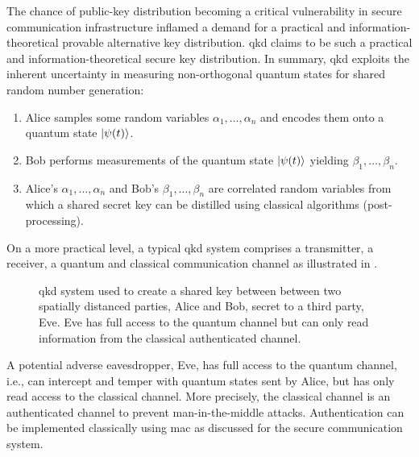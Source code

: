The chance of public-key distribution becoming a critical vulnerability in secure communication infrastructure inflamed a demand for a practical and information-theoretical provable alternative key distribution.
\gls{qkd} claims to be such a practical and information-theoretical secure key distribution.
In summary, \gls{qkd} exploits the inherent uncertainty in measuring non-orthogonal quantum states for shared random number generation:
\begin{enumerate}
	\item Alice samples some random variables $\alpha_1,\dots,\alpha_n$ and encodes them onto a quantum state $\lvert\psi(t)\rangle$.
	\item Bob performs measurements of the quantum state $\lvert\psi(t)\rangle$ yielding $\beta_1,\dots,\beta_n$.
	\item Alice's $\alpha_1,\dots,\alpha_n$ and Bob's $\beta_1,\dots,\beta_n$ are correlated random variables from which a shared secret key can be distilled using classical algorithms (post-processing).
\end{enumerate}
On a more practical level, a typical \gls{qkd} system comprises a transmitter, a receiver, a quantum and classical communication channel as illustrated in .
\begin{figure}[htb]
	\centering
	
	\caption{\Gls{qkd} system used to create a shared key between between two spatially distanced parties, Alice and Bob, secret to a third party, Eve. Eve has full access to the quantum channel but can only read information from the classical authenticated channel.}\label{fig:qkd_system}
\end{figure}
A potential adverse eavesdropper, Eve, has full access to the quantum channel, i.e., can intercept and temper with quantum states sent by Alice, but has only read access to the classical channel.
More precisely, the classical channel is an authenticated channel to prevent man-in-the-middle attacks.
Authentication can be implemented classically using \gls{mac} as discussed for the secure communication system.

